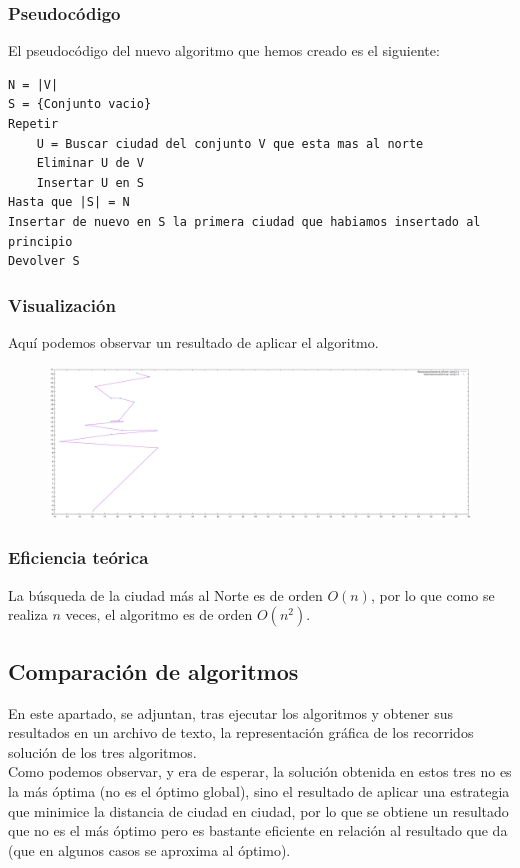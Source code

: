 \documentclass[11pt,a4paper]{article} %
\begin{document}
\subsubsection{Pseudocódigo}
El pseudocódigo del nuevo algoritmo que hemos creado es el siguiente:
\begin{lstlisting}
N = |V|
S = {Conjunto vacio}
Repetir
	U = Buscar ciudad del conjunto V que esta mas al norte
	Eliminar U de V
	Insertar U en S
Hasta que |S| = N
Insertar de nuevo en S la primera ciudad que habiamos insertado al principio
Devolver S
\end{lstlisting}

\subsubsection{Visualización}
Aquí podemos observar un resultado de aplicar el algoritmo.
\begin{figure}[H]
	\centering
	\includegraphics[width=13cm]{data/graphics/otro/otro.pdf}
\end{figure}

\subsubsection{Eficiencia teórica}
La búsqueda de la ciudad más al Norte es de orden $O(n)$, por lo que como se realiza $n$ veces, el algoritmo es de orden $O(n^2)$.


\newpage
\subsection{Comparación de algoritmos}
En este apartado, se adjuntan, tras ejecutar los algoritmos y obtener sus resultados en un archivo de texto, la representación gráfica de los recorridos solución de los tres algoritmos.\\

Como podemos observar, y era de esperar, la solución obtenida en estos tres no es la más óptima (no es el óptimo global), sino el resultado de aplicar una estrategia que minimice la distancia de ciudad en ciudad, por lo que se obtiene un resultado que no es el más óptimo pero es bastante eficiente en relación al resultado que da (que en algunos casos se aproxima al óptimo).\\
\end{document}
